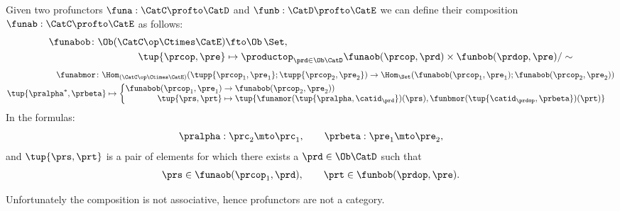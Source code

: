 \begin{widepar}
\begin{ctdefinition}
  \label{def:profunctor-composition}
  Given two profunctors $\funa: \CatC \profto \CatD$ and $\funb: \CatD \profto \CatE$
  we can define their composition $\funab: \CatC \profto \CatE$ as follows:
  \begin{equation}
    \begin{aligned}
    \funabob \colon \Ob(\CatC\op \Ctimes \CatE) & \fto  \Ob\, \Set, \\
    \tup{\prcop, \pre} & \mapsto \productop_{\prd\in\Ob \CatD} \funaob(\prcop, \prd) \times \funbob(\prdop, \pre) / \sim
    \end{aligned}
  \end{equation}
  \begin{equation}
    \begin{aligned}
      \funabmor  \colon \Hom_{(\CatC\op \Ctimes \CatE)}( \tupp{\prcop_1, \pre_1}; \tupp{\prcop_2, \pre_2}) \to \Hom_{\Set}( \funabob(\prcop_1, \pre_1); \funabob(\prcop_2, \pre_2)) \\
      \tup{\pralpha^\ast, \prbeta} \mapsto  \begin{cases}
        \begin{aligned}
          \funabob(\prcop_1, \pre_1) & \to   \funabob(\prcop_2, \pre_2)) \\
          \tup{\prs, \prt} & \mapsto  \tup{
              \funamor(\tup{\pralpha, \catid_{\prd}})(\prs),
              \funbmor(\tup{\catid_{\prdop}, \prbeta})(\prt)}
        \end{aligned}
      \end{cases}
    \end{aligned}
  \end{equation}
  In the formulas:
\begin{equation}
  \pralpha: \prc_2 \mto \prc_1, \qquad
  \prbeta: \pre_1 \mto \pre_2,
\end{equation}
and $\tup{\prs, \prt}$ is a pair of elements for which there exists a $\prd\in\Ob \CatD$ such that \begin{equation}\prs \in \funaob(\prcop_1, \prd), \qquad\prt \in \funbob(\prdop, \pre).
\end{equation}


\end{ctdefinition}
\end{widepar}

Unfortunately the composition is not associative, hence profunctors are not a category.

